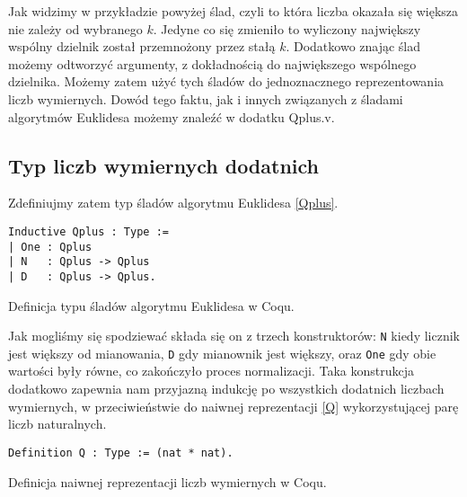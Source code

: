 Jak widzimy w przykładzie powyżej ślad, czyli to która liczba okazała się większa nie zależy od wybranego $k$. Jedyne co się zmieniło to wyliczony największy wspólny dzielnik został przemnożony przez stałą $k$. Dodatkowo znając ślad możemy odtworzyć argumenty, z dokładnością do największego wspólnego dzielnika. Możemy zatem użyć tych śladów do jednoznacznego reprezentowania liczb wymiernych. Dowód tego faktu, jak i innych związanych z śladami algorytmów Euklidesa możemy znaleźć w dodatku Qplus.v. 
\subsection{Typ liczb wymiernych dodatnich}
Zdefiniujmy zatem typ śladów algorytmu Euklidesa \ref{Qplus}.
\begin{code}
\begin{verbatim}
Inductive Qplus : Type :=
| One : Qplus
| N   : Qplus -> Qplus
| D   : Qplus -> Qplus.
\end{verbatim}
\caption{Definicja typu śladów algorytmu Euklidesa w Coqu.}
\label{Qplus}
\end{code}
Jak mogliśmy się spodziewać składa się on z trzech konstruktorów: \texttt{N} kiedy licznik jest większy od mianowania, \texttt{D} gdy mianownik jest większy, oraz \texttt{One} gdy obie wartości były równe, co zakończyło proces normalizacji. Taka konstrukcja dodatkowo zapewnia nam przyjazną indukcję po wszystkich dodatnich liczbach wymiernych, w przeciwieństwie do naiwnej reprezentacji \ref{Q} wykorzystującej parę liczb naturalnych.
\begin{code}
\begin{verbatim}
Definition Q : Type := (nat * nat).
\end{verbatim}
\caption{Definicja naiwnej reprezentacji liczb wymiernych w Coqu.}
\label{Q}
\end{code}
